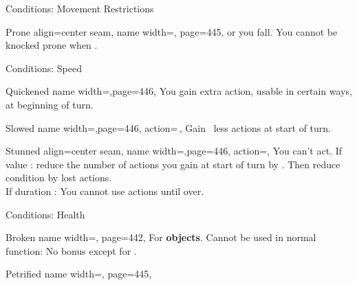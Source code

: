 \begin{PageFront}
\begin{Tables}{\frontTableHeight}
\begin{Table}{Conditions: Movement Restrictions}
\begin{entry}{Prone}{%
                align=center seam,
                name width=\conditionLength,%
                page=445,
            }
{                 or  you fall. You cannot be knocked prone when .}
            \end{entry}
        \end{Table}
        \TableSpace
        \begin{Table}{Conditions: Speed}
            \begin{entry}{Quickened}{%
                name width=\conditionLength,page=446,
            }
                You gain  extra action, usable in certain ways, at beginning of turn.\hfill {}
            \end{entry}
            \breakLine
            \begin{entry}{Slowed}{%
                name width=\conditionLength,page=446,
                action=\,\X,
            }
                Gain \X\, less actions at start of turn.
            \end{entry}
            \begin{entry}{Stunned}{%
                align=center seam,
                name width=\conditionLength,page=446,
                action=\XDur,
            }
                You can't act. \hfill If value \X: reduce the number of actions you gain at start of turn by \X
                . Then reduce condition by lost actions.\\
                If duration \Dur: You cannot use actions until over. \hfill {}
            \end{entry}
        \end{Table}
    \end{Tables}%
    \begin{Tables}{\frontTableHeight}
        \begin{Table}{Conditions: Health}
            \begin{entry}{Broken}{%
                name width=\conditionLength,%
                page=442,
            }
                For \textbf{objects}. Cannot be used in normal function: No \Item bonus except for . \hfill
            \end{entry}
            \begin{entry}{Petrified}{%
                name width=\conditionLength,%
                page=445,
            }

\end{entry}
\end{Table}
\end{Tables}
\end{PageFront}
